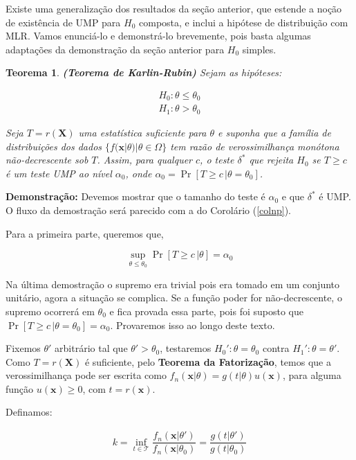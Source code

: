 \documentclass[a4paper,10pt, notitlepage]{report}
\newtheorem{teo}{Teorema}
\newcommand{\gt}{>}%
\newcommand{\pow}{^}%
\newcommand{\pr}{\operatorname{Pr}} %
\newcommand{\bX}{\boldsymbol{X}} %
\newcommand{\bx}{\boldsymbol{x}} %
\begin{document}
\begin{enumerate}
		Existe uma generalização dos resultados da seção anterior, que estende a noção de existência de UMP para $H_0$ composta, e inclui a hipótese de distribuição com MLR. Vamos enunciá-lo e demonstrá-lo brevemente, pois basta algumas adaptações da demonstração da seção anterior para $H_0$ simples.
		
		\begin{teo}
			\textbf{(Teorema de Karlin-Rubin)\citep{CaseBerg:karlin}} Sejam as hipóteses:
			
			\begin{align}
			\label{h0_karlin}
				H_0:\theta\leq\theta_0\\
				H_1:\theta\gt\theta_0\nonumber
			\end{align}
			
			Seja $T=r(\bX)$ uma estatística suficiente para $\theta$ e suponha que a família de distribuições dos dados $\{f(\bx|\theta)|\theta\in\Omega\}$ tem razão de verossimilhança monótona não-decrescente sob $T$. Assim, para qualquer $c$, o teste $\delta\pow*$ que rejeita $H_0$ se $T\geq c$ é um teste UMP ao nível $\alpha_0$, onde $\alpha_0=\pr[T\geq c\,|\theta=\theta_0]$.
		\end{teo} 
	
	\textbf{Demonstração:} Devemos mostrar que o tamanho do teste é $\alpha_0$ e que $\delta\pow*$ é UMP. O fluxo da demostração será parecido com a do Corolário (\ref{colnp}).
	
	Para a primeira parte, queremos que,
	
	$$\sup_{\theta\leq\theta_0}\pr[T\geq c\,|\theta]=\alpha_0$$
	
	Na última demostração o supremo era trivial pois era tomado em um conjunto unitário, agora a situação se complica. Se a função poder for não-decrescente, o supremo ocorrerá em $\theta_0$ e fica provada essa parte, pois foi suposto que $\pr[T\geq c\,|\theta=\theta_0]=\alpha_0$. Provaremos isso ao longo deste texto. 
	
	Fixemos $\theta'$ arbitrário tal que $\theta'>\theta_0$, testaremos $H_0':\theta=\theta_0$ contra $H_1':\theta=\theta'$.  Como $T=r(\bX)$ é suficiente, pelo \textbf{Teorema da Fatorização}, temos que a verossimilhança pode ser escrita como $f_n(\bx|\theta)=g(t|\theta)u(\bx)$, para alguma função $u(\bx)\geq0$, com $t=r(\bx)$.
	
	Definamos:
	
	\begin{align*}
	k=\inf_{t\in\mathcal{T}}\dfrac{f_n(\bx|\theta')}{f_n(\bx|\theta_0)}=\dfrac{g(t|\theta')}{g(t|\theta_0)}
	\end{align*}
	

\end{enumerate}
\end{document}
